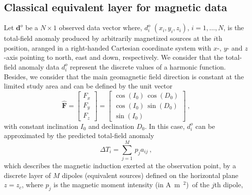 \documentclass[manuscript]{geophysics}
\begin{document}
\subsection{Classical equivalent layer for magnetic data}
Let $\mathbf{d}^{o}$ be a $N \times 1$ observed data vector where, $d^{o}_{i}$ $(x_{i}, y_{i}, z_{i})$, $i =  1, \dots, N $,
is the total-field anomaly  produced by arbitrarily magnetized sources at the $i$th position,
aranged in a right-handed Cartesian coordinate system with $x$-, $y$- and $z$-axis 
pointing to north, east and down, respectively.
We consider that the total-field anomaly data $d^{o}_{i}$ represent the discrete
values of a harmonic function. Besides, we consider that the main geomagnetic field 
direction is constant at the limited study area and can be defined by the unit vector
\begin{equation}
	\hat{\mathbf{F}} = \begin{bmatrix}
		F_x \\
		F_y \\
		F_z
	\end{bmatrix} =
	\begin{bmatrix}
		\cos(I_{0}) \, \cos(D_{0}) \\
		\cos(I_{0}) \, \sin(D_{0}) \\
		\sin(I_{0})
	\end{bmatrix} \: ,
	\label{eq:unit_vector_F}
\end{equation}
with constant inclination $I_{0}$ and declination $D_{0}$.
In this case, $d^{o}_{i}$ can be approximated by the predicted total-field anomaly \citep{blakely1996}
\begin{equation}
	\Delta T_{i} = \sum_{j=1}^{M} \, p_{j} a_{ij} \: ,
	\label{eq:integral-sum_mag}
\end{equation}
which describes the magnetic induction exerted at the observation point,
by a discrete layer of $M$ dipoles (equivalent sources) defined on the horizontal plane $z = z_{c}$, 
where $p_{j}$ is the magnetic moment intensity (in A~m~$^{2}$)~of the $j$th dipole, 
\end{document}
